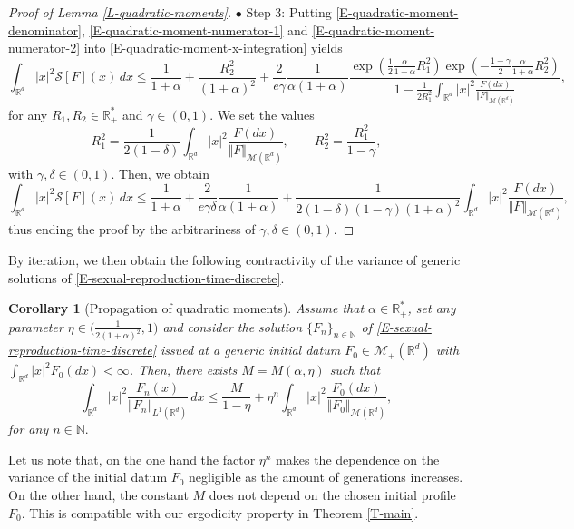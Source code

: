 \documentclass[reqno]{amsart}
\newtheorem{corollary}[definition]{Corollary}
\numberwithin{equation}{section}
\begin{document}
{\begin{proof}[Proof of Lemma \ref{L-quadratic-moments}]
$\bullet$ {\sc Step 3}: Putting \eqref{E-quadratic-moment-denominator}, \eqref{E-quadratic-moment-numerator-1} and \eqref{E-quadratic-moment-numerator-2} into \eqref{E-quadratic-moment-x-integration} yields
$$\int_{\mathbb{R}^d}\vert x\vert^2\mathcal{S}[F](x)\,dx\leq \frac{1}{1+\alpha}+\frac{R_2^2}{(1+\alpha)^2}+\frac{2}{e\gamma}\frac{1}{\alpha(1+\alpha)}\frac{\exp\left(\frac{1}{2}\frac{\alpha}{1+\alpha}R_1^2\right)\exp\left(-\frac{1-\gamma}{2}\frac{\alpha}{1+\alpha}R_2^2\right)}{1-\frac{1}{2R_1^2}\int_{\mathbb{R}^d}\vert x\vert^2\frac{F(dx)}{\Vert F\Vert_{\mathcal{M}(\mathbb{R}^d)}}},$$
for any $R_1,R_2\in \mathbb{R}_+^*$ and $\gamma\in (0,1)$. We set the values
$$R_1^2=\frac{1}{2(1-\delta)}\int_{\mathbb{R}^d}\vert x\vert^2\frac{F(dx)}{\Vert F\Vert_{\mathcal{M}(\mathbb{R}^d)}},\qquad R_2^2=\frac{R_1^2}{1-\gamma},$$
with $\gamma,\delta\in (0,1)$. Then, we obtain
$$\int_{\mathbb{R}^d}\vert x\vert^2\mathcal{S}[F](x)\,dx\leq \frac{1}{1+\alpha}+\frac{2}{e\gamma\delta}\frac{1}{\alpha(1+\alpha)}+\frac{1}{2(1-\delta)(1-\gamma)(1+\alpha)^2}\int_{\mathbb{R}^d}\vert x\vert^2\frac{F(dx)}{\Vert F\Vert_{\mathcal{M}(\mathbb{R}^d)}},$$
thus ending the proof by the arbitrariness of $\gamma,\delta\in (0,1)$.
\end{proof}

By iteration, we then obtain the following contractivity of the variance of generic solutions of \eqref{E-sexual-reproduction-time-discrete}.

\begin{corollary}[Propagation of quadratic moments]\label{C-quadratic-moments}
Assume that $\alpha\in \mathbb{R}_+^*$, set any parameter $\eta\in \big(\frac{1}{2(1+\alpha)^2},1\big)$ and consider the solution $\{F_n\}_{n\in \mathbb{N}}$ of \eqref{E-sexual-reproduction-time-discrete} issued at a generic initial datum $F_0\in \mathcal{M}_+(\mathbb{R}^d)$ with $\int_{\mathbb{R}^d}\vert x\vert^2 F_0(dx)<\infty$. Then, there exists $M=M(\alpha,\eta)$ such that
$$\int_{\mathbb{R}^d}\vert x\vert^2\frac{F_n(x)}{\Vert F_n\Vert_{L^1(\mathbb{R}^d)}}\,dx\leq \frac{M}{1-\eta}+\eta^n\int_{\mathbb{R}^d}\vert x\vert^2 \frac{F_0(dx)}{\Vert F_0\Vert_{\mathcal{M}(\mathbb{R}^d)}},$$
for any $n\in \mathbb{N}.$
\end{corollary}

Let us note that, on the one hand the factor $\eta^n$ makes the dependence on the variance of the initial datum $F_0$ negligible as the amount of generations increases. On the other hand, the constant $M$ does not depend on the chosen initial profile $F_0$. This is compatible with our ergodicity property in Theorem \ref{T-main}.

}
\end{document}
